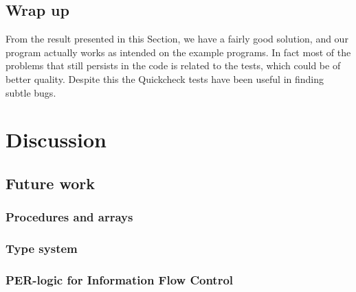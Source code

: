 \subsection*{Wrap up}
From the result presented in this Section, we have a fairly good solution, and our program actually works as intended on the example programs.
In fact most of the problems that still persists in the code is related to the tests, which could be of better quality. Despite this the Quickcheck tests have been useful in finding subtle bugs.

\section{Discussion}

\subsection{Future work}

\subsubsection{Procedures and arrays}

\subsubsection{Type system}

\subsubsection{PER-logic for Information Flow Control}
